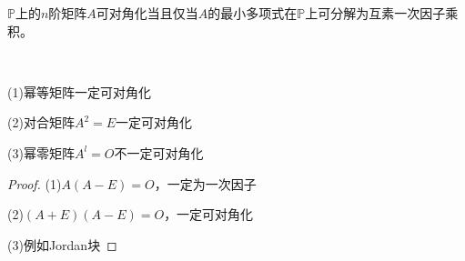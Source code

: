\begin{theorem}[最小多项式与相似对角化]
  $\mathbb{P}$上的$n$阶矩阵$A$可对角化当且仅当$A$的最小多项式在$\mathbb{P}$上可分解为互素一次因子乘积。
\end{theorem}

~

\begin{exercise}[最小多项式判断可对角化]
  (1)幂等矩阵一定可对角化

  (2)对合矩阵$A^2 = E$一定可对角化

  (3)幂零矩阵$A^l = O$不一定可对角化
\end{exercise}

\begin{proof}
  (1)$A(A-E) = O$，一定为一次因子

  (2)$(A+E)(A- E) = O$，一定可对角化

  (3)例如Jordan块
\end{proof}





